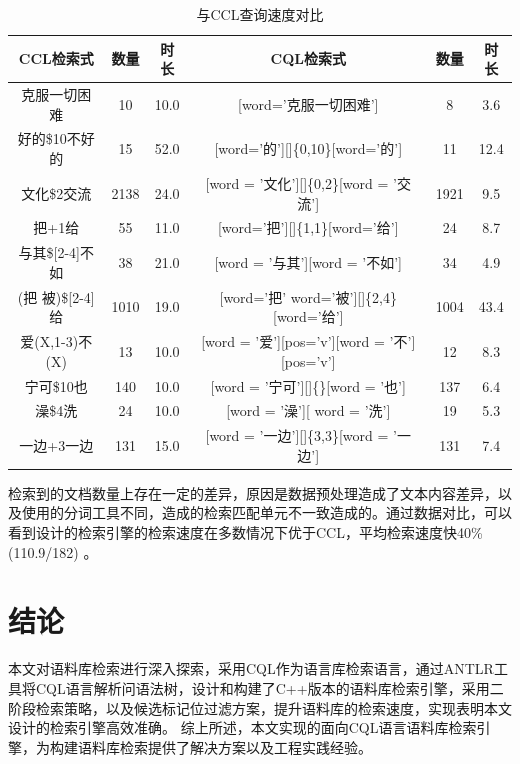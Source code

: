 \documentclass[11pt]{article}
\begin{document}
\begin{CJK*}{UTF8}{gbsn}
\begin{table}[h]
	\begin{center}
		\begin{tabular}{|c|c|c|c|c|c|}
			\hline \bf CCL检索式 & \bf 数量 & \bf 时长& \bf CQL检索式 & \bf 数量 & \bf 时长 \\ \hline
			克服一切困难 & 10 & 10.0 & [word='克服一切困难'] & 8 & 3.6 \\
			好的\$10不好的 &15 & 52.0 & [word='的'][]\{0,10\}[word='的'] & 11 & 12.4 \\
			文化\$2交流 & 2138 & 24.0 & [word = '文化'][]\{0,2\}[word = '交流'] & 1921 & 9.5 \\
			把+1给 & 55 & 11.0 & [word='把'][]\{1,1\}[word='给'] & 24 & 8.7 \\
			与其\$[2-4]不如 & 38 & 21.0 & [word = '与其'][word = '不如'] & 34 & 4.9 \\
			(把 \textbar 被)\$[2-4]给 & 1010 & 19.0 & [word='把'  \textbar word='被'][]\{2,4\}[word='给'] & 1004 & 43.4 \\
			爱(X,1-3)不(X) & 13 & 10.0 & [word = '爱'][pos='v'][word = '不'][pos='v'] & 12 & 8.3 \\
			宁可\$10也 & 140 & 10.0 & [word = '宁可'][]\{\}[word = '也'] & 137 & 6.4 \\
			澡\$4洗 & 24 & 10.0 & [word = '澡'][ word = '洗'] & 19 & 5.3 \\
			一边+3一边 & 131 & 15.0 & [word = '一边'][]\{3,3\}[word = '一边'] & 131 & 7.4 \\
			\hline
		\end{tabular}
	\end{center}
	\caption{\label{font-table} 与CCL查询速度对比}
\end{table}

检索到的文档数量上存在一定的差异，原因是数据预处理造成了文本内容差异，以及使用的分词工具不同，造成的检索匹配单元不一致造成的。通过数据对比，可以看到设计的检索引擎的检索速度在多数情况下优于CCL，平均检索速度快40\%(110.9/182) 。

\section{结论}

本文对语料库检索进行深入探索，采用CQL作为语言库检索语言，通过ANTLR工具将CQL语言解析问语法树，设计和构建了C++版本的语料库检索引擎，采用二阶段检索策略，以及候选标记位过滤方案，提升语料库的检索速度，实现表明本文设计的检索引擎高效准确。
\cite{li2023can}
综上所述，本文实现的面向CQL语言语料库检索引擎，为构建语料库检索提供了解决方案以及工程实践经验。



%


\end{CJK*}
\end{document}
